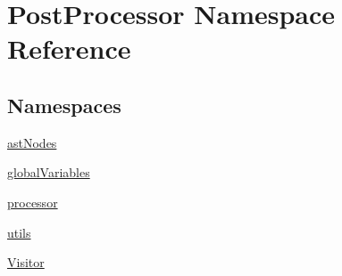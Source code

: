 \hypertarget{namespacePostProcessor}{}\section{Post\+Processor Namespace Reference}
\label{namespacePostProcessor}
\subsection*{Namespaces}
\begin{DoxyCompactItemize}
\item 
 \hyperlink{namespacePostProcessor_1_1astNodes}{ast\+Nodes}
\item 
 \hyperlink{namespacePostProcessor_1_1globalVariables}{global\+Variables}
\item 
 \hyperlink{namespacePostProcessor_1_1processor}{processor}
\item 
 \hyperlink{namespacePostProcessor_1_1utils}{utils}
\item 
 \hyperlink{namespacePostProcessor_1_1Visitor}{Visitor}
\end{DoxyCompactItemize}

